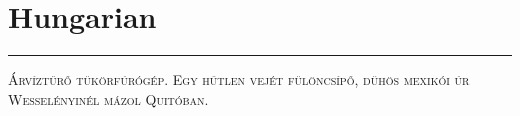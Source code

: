 \vspace{-1em}\section*{\checkyes Hungarian}
\vspace{-.5em}\hrule\vspace{.5em}
\noindent\textsc{
Árvíztűrő tükörfúrógép. Egy hűtlen vejét fülöncsípő, 
dühös mexikói úr Wesselényinél mázol Quitóban.}